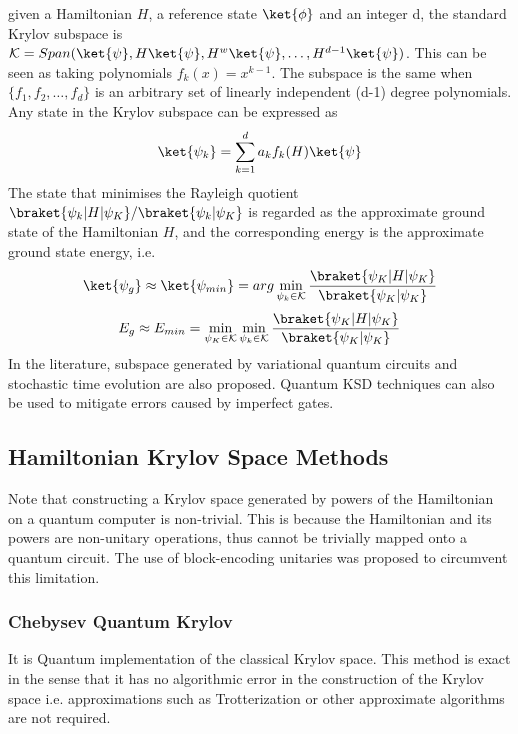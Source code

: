 \documentclass[12pt, oneside]{book}
\theoremstyle{definition}
\theoremstyle{definition}
\theoremstyle{remark}
\begin{document}
given a Hamiltonian $H$, a reference state $\ket{\phi}$ and an integer d, the standard Krylov subspace is $\mathcal{K}=Span(\ket{\psi},H\ket{\psi},H^w\ket{\psi},\ldots,H^{d-1}\ket{\psi})$. This can be seen as taking polynomials $f_k(x)=x^{k-1}$. The subspace is the same when $\{f_1,f_2,\ldots,f_d\}$ is an arbitrary set of linearly independent (d-1) degree polynomials. Any state in the Krylov subspace can be expressed as
\[
\ket{\psi_k}=\sum_{k=1}^{d} a_kf_k(H)\ket{\psi}
\]
The state that minimises the Rayleigh quotient $\braket{\psi_k|H|\psi_K}/\braket{\psi_k|\psi_K}$ is regarded as the approximate ground state of the Hamiltonian $H$, and the corresponding energy is the approximate ground state energy, i.e. 
\[
\ket{\psi_g} \approx \ket{\psi_{min}} = arg \min_{\psi_k \in \mathcal{K}} \frac{\braket{\psi_K|H|\psi_K}}{\braket{\psi_K|\psi_K}}
\]
\[
E_g \approx E_{min} = \min_{\psi_K \in \mathcal{K}} \min_{\psi_k \in \mathcal{K}} \frac{\braket{\psi_K|H|\psi_K}}{\braket{\psi_K|\psi_K}}
\]
In the literature, subspace generated by variational quantum circuits and stochastic time evolution are also proposed. Quantum KSD techniques can also be used to mitigate errors caused by imperfect gates.







\subsection{Hamiltonian Krylov Space Methods}
Note that constructing a Krylov space generated by powers of the Hamiltonian on a quantum computer is non-trivial. This is because the Hamiltonian and its powers are non-unitary operations, thus cannot be trivially mapped onto a quantum circuit. The use of block-encoding unitaries was proposed to circumvent this limitation.

\subsubsection{Chebysev Quantum Krylov}
It is Quantum implementation of the classical Krylov space. This method is exact in the sense that it has no algorithmic error in the construction of the Krylov space i.e. approximations such as Trotterization or other approximate algorithms are not required. 
\end{document}
